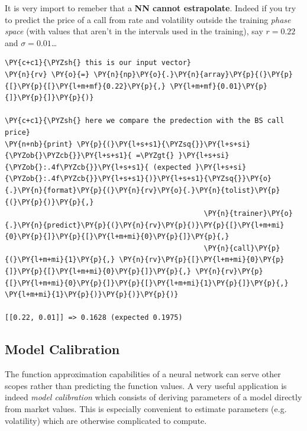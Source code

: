 It is very import to remeber that a \textbf{NN cannot estrapolate}.
Indeed if you try to predict the price of a call from rate and
volatility outside the training \emph{phase space} (with values that
aren't in the intervals used in the training), say \(r = 0.22\) and
\(\sigma = 0.01\)\ldots{}

\begin{tcolorbox}[breakable, size=fbox, boxrule=1pt, pad at break*=1mm,colback=cellbackground, colframe=cellborder]
\begin{Verbatim}[commandchars=\\\{\}]
\PY{c+c1}{\PYZsh{} this is our input vector}
\PY{n}{rv} \PY{o}{=} \PY{n}{np}\PY{o}{.}\PY{n}{array}\PY{p}{(}\PY{p}{[}\PY{p}{[}\PY{l+m+mf}{0.22}\PY{p}{,} \PY{l+m+mf}{0.01}\PY{p}{]}\PY{p}{]}\PY{p}{)}
	
\PY{c+c1}{\PYZsh{} here we compare the predection with the BS call price}
\PY{n+nb}{print} \PY{p}{(}\PY{l+s+s1}{\PYZsq{}}\PY{l+s+si}{\PYZob{}\PYZcb{}}\PY{l+s+s1}{ =\PYZgt{} }\PY{l+s+si}{\PYZob{}:.4f\PYZcb{}}\PY{l+s+s1}{ (expected }\PY{l+s+si}{\PYZob{}:.4f\PYZcb{}}\PY{l+s+s1}{)}\PY{l+s+s1}{\PYZsq{}}\PY{o}{.}\PY{n}{format}\PY{p}{(}\PY{n}{rv}\PY{o}{.}\PY{n}{tolist}\PY{p}{(}\PY{p}{)}\PY{p}{,} 
                                               \PY{n}{trainer}\PY{o}{.}\PY{n}{predict}\PY{p}{(}\PY{n}{rv}\PY{p}{)}\PY{p}{[}\PY{l+m+mi}{0}\PY{p}{]}\PY{p}{[}\PY{l+m+mi}{0}\PY{p}{]}\PY{p}{,} 
                                               \PY{n}{call}\PY{p}{(}\PY{l+m+mi}{1}\PY{p}{,} \PY{n}{rv}\PY{p}{[}\PY{l+m+mi}{0}\PY{p}{]}\PY{p}{[}\PY{l+m+mi}{0}\PY{p}{]}\PY{p}{,} \PY{n}{rv}\PY{p}{[}\PY{l+m+mi}{0}\PY{p}{]}\PY{p}{[}\PY{l+m+mi}{1}\PY{p}{]}\PY{p}{,} \PY{l+m+mi}{1}\PY{p}{)}\PY{p}{)}\PY{p}{)}

[[0.22, 0.01]] => 0.1628 (expected 0.1975)
\end{Verbatim}
\end{tcolorbox}

\subsection{Model Calibration}\label{model-calibration}

The function approximation capabilities of a neural network can serve
other scopes rather than predicting the function values. A very useful
application is indeed \emph{model calibration} which consists of
deriving parameters of a model directly from market values. This is
especially convenient to estimate parameters (e.g. volatility) which are
otherwise complicated to compute.


